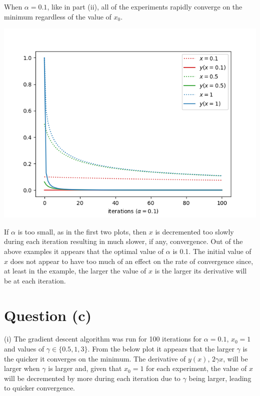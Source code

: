 \documentclass[12pt]{article}
\begin{document}
When $\alpha = 0.1$, like in part (ii), all of the experiments rapidly converge on the minimum regardless of the value of $x_0$.

\begin{center}
    \includegraphics[scale=0.55]{figs/b/b_iii_3.png}
\end{center}

If $\alpha$ is too small, as in the first two plots, then $x$ is decremented too slowly during each iteration resulting in much slower, if any, convergence. Out of the above examples it appears that the optimal value of $\alpha$ is 0.1. The initial value of $x$ does not appear to have too much of an effect on the rate of convergence since, at least in the example, the larger the value of $x$ is the larger its derivative will be at each iteration.

\section*{Question (c)}

\noindent (i) The gradient descent algorithm was run for 100 iterations for $\alpha=0.1$, $x_0=1$ and values of $\gamma \in \{0.5, 1, 3\}$. From the below plot it appears that the larger $\gamma$ is the quicker it converges on the minimum. The derivative of $y(x)$, $2\gamma x$, will be larger when $\gamma$ is larger and, given that $x_0=1$ for each experiment, the value of $x$ will be decremented by more during each iteration due to $\gamma$ being larger, leading to quicker convergence.
\end{document}
